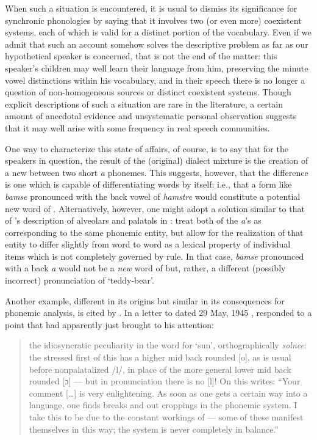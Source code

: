 When such a situation is encountered, it is usual to dismiss its
significance for synchronic phonologies by saying that it involves two
(or even more) coexistent systems, each of which is valid for a
distinct portion of the vocabulary. Even if we admit that such an
account somehow solves the descriptive problem as far as our
hypothetical  speaker is concerned, that is not the end of the
matter: this speaker's children may well learn their language from
him, preserving the minute vowel distinctions within his vocabulary,
and in their speech there is no longer a question of non-homogeneous
sources or distinct coexistent systems. Though explicit descriptions
of such a situation are rare in the literature, a certain amount of
anecdotal evidence and unsystematic personal observation suggests that
it may well arise with some frequency in real speech communities.

One way to characterize this state of affairs, of course, is to say
that for the speakers in question, the result of the (original)
dialect mixture is the creation of a new  between two short
\emph{a} phonemes. This suggests, however, that the difference is one
which is capable of differentiating words by itself: i.e., that a form
like \emph{bamse} pronounced with the back vowel of \emph{hamstre}
would constitute a potential new word of . Alternatively,
however, one might adopt a solution similar to that of {\Sapir}'s
description of alveolars and palatals in : treat both
of the \emph{a}'s as corresponding to the same phonemic entity, but
allow for the realization of that entity to differ slightly from word
to word as a lexical property of individual items which is not
completely governed by rule. In that case, \emph{bamse} pronounced
with a back \emph{a} would not be a \emph{new} word of  but,
rather, a different (possibly incorrect) pronunciation of
`teddy-bear'.

Another example, different in its origins but similar in its
consequences for phonemic analysis, is cited by
\citet[301f.]{hockett99:bloomfield.bio}. In a letter to {\Jakobson} dated
29 May, 1945 \citep[749]{halle88:bloomfield-jakobson}, {\Bloomfield}
responded to a point that {\Jakobson} had apparently just brought to his
attention:
\begin{quotation}
 the
  idiosyncratic peculiarity in the  word for `sun',
  orthographically \emph{solnce}: the stressed first  of this
  has a higher mid back rounded [o], as is usual before nonpalatalized
  /l/, in place of the more general lower mid back rounded [ɔ] — but
  in pronunciation there is no [l]! On this {\Bloomfield} writes: ``Your
  comment [\ldots] is very enlightening. As soon as one gets a certain
  way into a language, one finds breaks and out­ croppings in the
  phonemic system. I take this to be due to the constant workings of
   — some of these manifest themselves in this way; the
  system is never completely in balance.''
\end{quotation}

